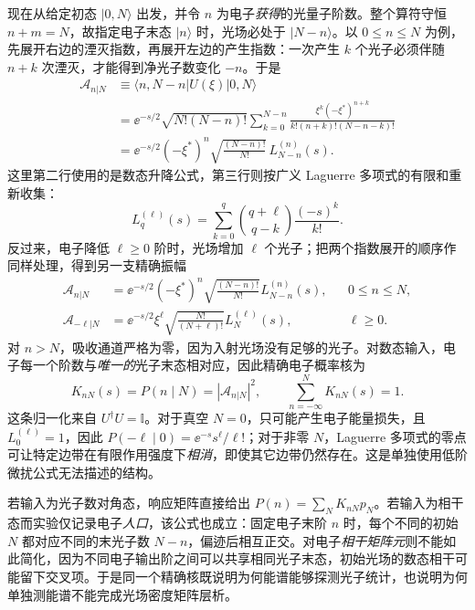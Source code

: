 现在从给定初态 $|0,N\rangle$ 出发，并令 $n$ 为电子\emph{获得}的光量子阶数。整个算符守恒 $n+m=N$，故指定电子末态 $|n\rangle$ 时，光场必处于 $|N-n\rangle$。以 $0\le n\le N$ 为例，先展开右边的湮灭指数，再展开左边的产生指数：一次产生 $k$ 个光子必须伴随 $n+k$ 次湮灭，才能得到净光子数变化 $-n$。于是
\begin{align*}
\mathcal A_{n|N}
&\equiv\langle n,N-n|U(\xi)|0,N\rangle\\
&=\ee^{-s/2}\sqrt{N!(N-n)!}
\sum_{k=0}^{N-n}\frac{\xi^k(-\xi^*)^{n+k}}{k!(n+k)!(N-n-k)!}\\
&=\ee^{-s/2}(-\xi^*)^n\sqrt{\frac{(N-n)!}{N!}}\,L_{N-n}^{(n)}(s).
\end{align*}
这里第二行使用的是数态升降公式，第三行则按广义 Laguerre 多项式的有限和重新收集：
\[
L_q^{(\ell)}(s)=\sum_{k=0}^{q}\binom{q+\ell}{q-k}\frac{(-s)^k}{k!}.
\]
反过来，电子降低 $\ell\ge0$ 阶时，光场增加 $\ell$ 个光子；把两个指数展开的顺序作同样处理，得到另一支精确振幅
\begin{equation}
\begin{aligned}
\mathcal A_{n|N}
&=\ee^{-s/2}(-\xi^*)^n\sqrt{\frac{(N-n)!}{N!}}
L_{N-n}^{(n)}(s),&&0\le n\le N,\\
\mathcal A_{-\ell|N}
&=\ee^{-s/2}\xi^\ell\sqrt{\frac{N!}{(N+\ell)!}}
L_N^{(\ell)}(s),&&\ell\ge0.
\end{aligned}
\label{eq:quantum-laguerre-amplitudes}
\end{equation}
对 $n>N$，吸收通道严格为零，因为入射光场没有足够的光子。对数态输入，电子每一个阶数与\emph{唯一的}光子末态相对应，因此精确电子概率核为
\begin{equation}
K_{nN}(s)=P(n\mid N)=|\mathcal A_{n|N}|^2,
\qquad \sum_{n=-\infty}^{N}K_{nN}(s)=1.
\label{eq:quantum-exact-response-kernel}
\end{equation}
这条归一化来自 $U^\dagger U=\mathbb I$。对于真空 $N=0$，只可能产生电子能量损失，且 $L_0^{(\ell)}=1$，因此 $P(-\ell\mid0)=\ee^{-s}s^\ell/\ell!$；对于非零 $N$，Laguerre 多项式的零点可让特定边带在有限作用强度下\emph{相消}，即使其它边带仍然存在。这是单独使用低阶微扰公式无法描述的结构。

若输入为光子数对角态，响应矩阵直接给出 $P(n)=\sum_NK_{nN}p_N$。若输入为相干态而实验仅记录电子\emph{人口}，该公式也成立：固定电子末阶 $n$ 时，每个不同的初始 $N$ 都对应不同的末光子数 $N-n$，偏迹后相互正交。对电子\emph{相干矩阵元}则不能如此简化，因为不同电子输出阶之间可以共享相同光子末态，初始光场的数态相干可能留下交叉项。于是同一个精确核既说明为何能谱能够探测光子统计，也说明为何单独测能谱不能完成光场密度矩阵层析。

